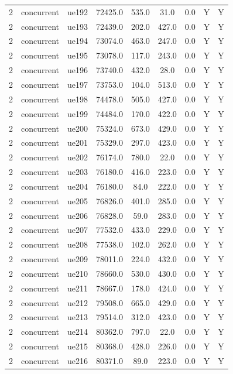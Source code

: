 \begin{table}[ht]
\begin{tabular}{|c|c|c|c|c|c|c|c|c|}
2 & concurrent & ue192 & 72425.0 & 535.0 & 31.0 & 0.0 & Y & Y \\
2 & concurrent & ue193 & 72439.0 & 202.0 & 427.0 & 0.0 & Y & Y \\
2 & concurrent & ue194 & 73074.0 & 463.0 & 247.0 & 0.0 & Y & Y \\
2 & concurrent & ue195 & 73078.0 & 117.0 & 243.0 & 0.0 & Y & Y \\
2 & concurrent & ue196 & 73740.0 & 432.0 & 28.0 & 0.0 & Y & Y \\
2 & concurrent & ue197 & 73753.0 & 104.0 & 513.0 & 0.0 & Y & Y \\
2 & concurrent & ue198 & 74478.0 & 505.0 & 427.0 & 0.0 & Y & Y \\
2 & concurrent & ue199 & 74484.0 & 170.0 & 422.0 & 0.0 & Y & Y \\
2 & concurrent & ue200 & 75324.0 & 673.0 & 429.0 & 0.0 & Y & Y \\
2 & concurrent & ue201 & 75329.0 & 297.0 & 423.0 & 0.0 & Y & Y \\
2 & concurrent & ue202 & 76174.0 & 780.0 & 22.0 & 0.0 & Y & Y \\
2 & concurrent & ue203 & 76180.0 & 416.0 & 223.0 & 0.0 & Y & Y \\
2 & concurrent & ue204 & 76180.0 & 84.0 & 222.0 & 0.0 & Y & Y \\
2 & concurrent & ue205 & 76826.0 & 401.0 & 285.0 & 0.0 & Y & Y \\
2 & concurrent & ue206 & 76828.0 & 59.0 & 283.0 & 0.0 & Y & Y \\
2 & concurrent & ue207 & 77532.0 & 433.0 & 229.0 & 0.0 & Y & Y \\
2 & concurrent & ue208 & 77538.0 & 102.0 & 262.0 & 0.0 & Y & Y \\
2 & concurrent & ue209 & 78011.0 & 224.0 & 432.0 & 0.0 & Y & Y \\
2 & concurrent & ue210 & 78660.0 & 530.0 & 430.0 & 0.0 & Y & Y \\
2 & concurrent & ue211 & 78667.0 & 178.0 & 424.0 & 0.0 & Y & Y \\
2 & concurrent & ue212 & 79508.0 & 665.0 & 429.0 & 0.0 & Y & Y \\
2 & concurrent & ue213 & 79514.0 & 312.0 & 423.0 & 0.0 & Y & Y \\
2 & concurrent & ue214 & 80362.0 & 797.0 & 22.0 & 0.0 & Y & Y \\
2 & concurrent & ue215 & 80368.0 & 428.0 & 226.0 & 0.0 & Y & Y \\
2 & concurrent & ue216 & 80371.0 & 89.0 & 223.0 & 0.0 & Y & Y \\

\end{tabular}
\end{table}
